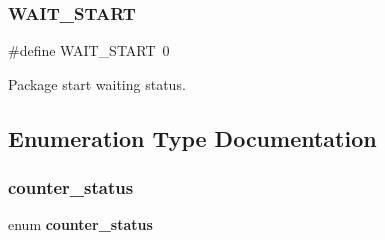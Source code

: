 \subsubsection{W\+A\+I\+T\+\_\+\+S\+T\+A\+RT}
{\footnotesize\ttfamily \#define W\+A\+I\+T\+\_\+\+S\+T\+A\+RT~0}

Package start waiting status. 

\subsection{Enumeration Type Documentation}
\mbox{\label{globals_8h_a368077232a067805e98c61f28948abee}} 
\subsubsection{counter\+\_\+status}
{\footnotesize\ttfamily enum \textbf{ counter\+\_\+status}}

